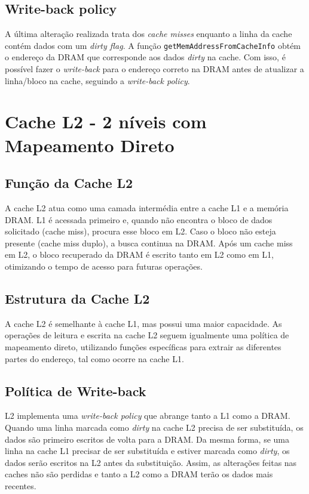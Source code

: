 \documentclass{article}
\begin{document}
\subsection{Write-back policy}
A última alteração realizada trata dos \textit{cache misses} enquanto a linha da cache contém dados com um \textit{dirty flag}. A função \texttt{getMemAddressFromCacheInfo} obtém o endereço da DRAM que corresponde aos dados \textit{dirty} na cache. Com isso, é possível fazer o \textit{write-back} para o endereço correto na DRAM antes de atualizar a linha/bloco na cache, seguindo a \textit{write-back policy}.

\section{Cache L2 - 2 níveis com Mapeamento Direto}
\subsection{Função da Cache L2}
A cache L2 atua como uma camada intermédia entre a cache L1 e a memória DRAM. L1 é acessada primeiro e, quando não encontra o bloco de dados solicitado (cache miss), procura esse bloco em L2. Caso o bloco não esteja presente (cache miss duplo), a busca continua na DRAM. Após um cache miss em L2, o bloco recuperado da DRAM é escrito tanto em L2 como em L1, otimizando o tempo de acesso para futuras operações.

\subsection{Estrutura da Cache L2}
A cache L2 é semelhante à cache L1, mas possui uma maior capacidade. As operações de leitura e escrita na cache L2 seguem igualmente uma política de mapeamento direto, utilizando funções específicas para extrair as diferentes partes do endereço, tal como ocorre na cache L1.

\subsection{Política de Write-back}
L2 implementa uma \textit{write-back policy} que abrange tanto a L1 como a DRAM. Quando uma linha marcada como \textit{dirty} na cache L2 precisa de ser substituída, os dados são primeiro escritos de volta para a DRAM. Da mesma forma, se uma linha na cache L1 precisar de ser substituída e estiver marcada como \textit{dirty}, os dados serão escritos na L2 antes da substituição. Assim, as alterações feitas nas caches não são perdidas e tanto a L2 como a DRAM terão os dados mais recentes.
\end{document}

